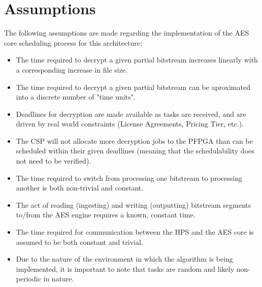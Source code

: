 \section{Assumptions}\label{sec:EDFAssumptions}
The following assumptions are made regarding the implementation of the AES core scheduling process for this architecture:
\begin{itemize}
    \item The time required to decrypt a given partial bitstream increases linearly with a corresponding increase in file size.
    \item The time required to decrypt a given partial bitstream can be aproximated into a discrete number of "time units".
    \item Deadlines for decryption are made available as tasks are received, and are driven by real world constraints (License Agreements, Pricing Tier, etc.).
    \item The CSP will not allocate more decryption jobs to the PFPGA than can be scheduled within their given deadlines (meaning that the schedulability does not need to be verified).
    \item The time required to switch from processing one bitstream to processing another is both non-trivial and constant.
    \item The act of reading (ingesting) and writing (outputting) bitstream segments to/from the AES engine requires a known, constant time.
    \item The time required for communication between the HPS and the AES core is assumed to be both constant and trivial.
    \item Due to the nature of the environment in which the algorithm is being implemented, it is important to note that tasks are random and likely non-periodic in nature.
\end{itemize}

